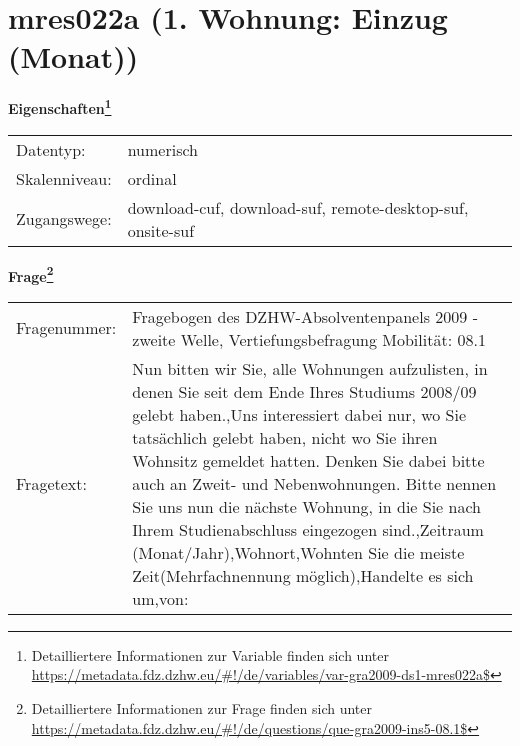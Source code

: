 
    \setcounter{footnote}{0}

    \vspace*{-1.8cm}
	\section{mres022a (1. Wohnung: Einzug (Monat))}
	\label{section:mres022a}



    \vspace*{0.5cm}
    \noindent\textbf{Eigenschaften\footnote{Detailliertere Informationen zur Variable finden sich unter
		\url{https://metadata.fdz.dzhw.eu/\#!/de/variables/var-gra2009-ds1-mres022a$}}}\\
	\begin{tabularx}{\hsize}{@{}lX}
	Datentyp: & numerisch \\
	Skalenniveau: & ordinal \\
	Zugangswege: &
	  download-cuf, 
	  download-suf, 
	  remote-desktop-suf, 
	  onsite-suf
 \\
    \end{tabularx}



				\vspace*{0.5cm}
                \noindent\textbf{Frage\footnote{Detailliertere Informationen zur Frage finden sich unter
		              \url{https://metadata.fdz.dzhw.eu/\#!/de/questions/que-gra2009-ins5-08.1$}}}\\
				\begin{tabularx}{\hsize}{@{}lX}
					Fragenummer: &
					  Fragebogen des DZHW-Absolventenpanels 2009 - zweite Welle, Vertiefungsbefragung Mobilität:
					  08.1
 \\
					Fragetext: & Nun bitten wir Sie, alle Wohnungen aufzulisten, in denen Sie seit dem Ende Ihres Studiums 2008/09 gelebt haben.,Uns interessiert dabei nur, wo Sie tatsächlich gelebt haben, nicht wo Sie ihren Wohnsitz gemeldet hatten. Denken Sie dabei bitte auch an Zweit- und Nebenwohnungen. Bitte nennen Sie uns nun die nächste Wohnung, in die Sie nach Ihrem Studienabschluss eingezogen sind.,Zeitraum (Monat/Jahr),Wohnort,Wohnten Sie die meiste Zeit(Mehrfachnennung möglich),Handelte es sich um,von: \\
				\end{tabularx}





